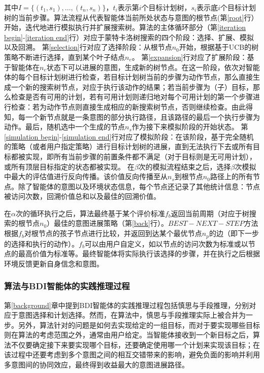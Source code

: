 其中$I=\{(t_1,s_1), \dots, (t_n, s_n)\}$，$t_i$表示第$i$个目标计划树，$s_i$表示底$i$个目标计划树的当前步骤。算法流程从代表智能体当前所处状态与意图的根节点(第\ref{root}行）开始，迭代地进行模拟执行并扩展搜索树。算法的主体循环部分（第\ref{iteration begin}-\ref{iteration end}行）对应于蒙特卡洛树搜索的四个阶段：选择、扩展、模拟以及回溯。
第\ref{selection}行对应了选择阶段：从根节点$n_0$开始，根据基于UCB的树策略不断进行选择，直到某个叶子结点$n_e$。
第\ref{expansion}行对应了扩展阶段：基于智能体在$n_e$状态下可以进展的意图，生成新的树节点。在这一阶段，依次对智能体的每个目标计划树进行检查，若目标计划树当前的步骤为动作节点，那么直接生成一个新的搜索树节点，对应于执行该动作的结果；若当前步骤为（子）目标，那么检查是否有可用的计划，若有可用计划则递归地对每个可用计划的第一个步骤进行检查：若为动作节点则直接生成相应的新搜索树节点，否则继续检查。由此得知，每一个新节点就是一条意图的部分执行路径，且该路径的最后一个执行步骤为动作。最后，随机选中一个生成的节点$n_s$作为接下来模拟阶段的开始状态。
第\ref{simulation begin}-\ref{simulation end}行对应了模拟阶段：在该阶段，基于完全随机的策略（或者用户指定策略）进行目标计划树的进展，直到无法执行下去或所有目标都被实现，即所有当前步骤的前置条件都不满足（对于目标则是无可用计划），或所有顶层目标指定的状态都被实现。
在$\beta$次的模拟流程结束之后，选择$\beta$次模拟中最大的评估值进行反向传播。该价值反向传播至从$n_s$到根节点$n_0$路径上的所有节点。除了智能体的意图以及环境状态信息，每个节点还记录了其他统计信息：节点被访问次数，回溯价值总和以及最佳的回溯价值。

在$\alpha$次的循环执行之后，\SA 算法最终基于某个评价标准$f_b$返回当前周期（对应于树搜索的根节点$n_0$）最佳的意图进展策略（第\ref{back}行）。$BEST-NEXT-STEP$方法根据$f_b$对根节点的孩子节点进行比较，并返回到达某个最优节点$n_p$的边（即下一步的选择和执行的动作）。$f_b$可以由用户自定义，如以节点的访问次数为标准或以节点的最高价值为标准等。最终智能体将实际执行该选择的步骤，并在执行之后根据环境反馈更新自身信念和意图。

\subsubsection{\SA 算法与BDI智能体的实践推理过程}
第\ref{background}章中提到BDI智能体的实践推理过程包括慎思与手段推理，分别对应于意图选择和计划选择。然而，在\SA 算法中，慎思与手段推理实际上被合并为一步。另外，\SA 算法针对的问题是如何去实现给定的一组目标，而对于要实现哪些目标则在\SA 算法的考虑范围之外，通常由用户给定。当智能体接收到一个新目标之后，\SA 算法不仅要确定接下来要实现哪个目标，还要确定使用哪一个计划来实现该目标；在该过程中还要考虑到多个意图之间的相互交错带来的影响，避免负面的影响并利用多意图间的协同效应，最终得到收益最大的意图进展路径。

